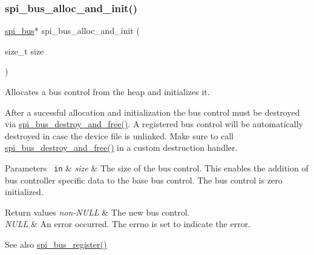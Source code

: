\subsubsection{\texorpdfstring{spi\_bus\_alloc\_and\_init()}{spi\_bus\_alloc\_and\_init()}}
{\footnotesize\ttfamily \mbox{\hyperlink{structspi__bus}{spi\+\_\+bus}}$\ast$ spi\+\_\+bus\+\_\+alloc\+\_\+and\+\_\+init (\begin{DoxyParamCaption}\item[{size\+\_\+t}]{size }\end{DoxyParamCaption})}



Allocates a bus control from the heap and initializes it. 

After a sucessful allocation and initialization the bus control must be destroyed via \mbox{\hyperlink{group__SPI_ga6c6868bad5d8e9ea136b23947dd9a7a6}{spi\+\_\+bus\+\_\+destroy\+\_\+and\+\_\+free()}}. A registered bus control will be automatically destroyed in case the device file is unlinked. Make sure to call \mbox{\hyperlink{group__SPI_ga6c6868bad5d8e9ea136b23947dd9a7a6}{spi\+\_\+bus\+\_\+destroy\+\_\+and\+\_\+free()}} in a custom destruction handler.


\begin{DoxyParams}[1]{Parameters}
\mbox{\texttt{ in}}  & {\em size} & The size of the bus control. This enables the addition of bus controller specific data to the base bus control. The bus control is zero initialized.\\
\hline
\end{DoxyParams}

\begin{DoxyRetVals}{Return values}
{\em non-\/\+N\+U\+LL} & The new bus control. \\
\hline
{\em N\+U\+LL} & An error occurred. The errno is set to indicate the error.\\
\hline
\end{DoxyRetVals}
\begin{DoxySeeAlso}{See also}
\mbox{\hyperlink{group__SPI_ga4e6ca0b1d473a6be4fbbefa2ed1a55f2}{spi\+\_\+bus\+\_\+register()}} 
\end{DoxySeeAlso}
\mbox{\label{group__SPI_ga6d316300e2bb231728d32b5dda355dcd}} 
